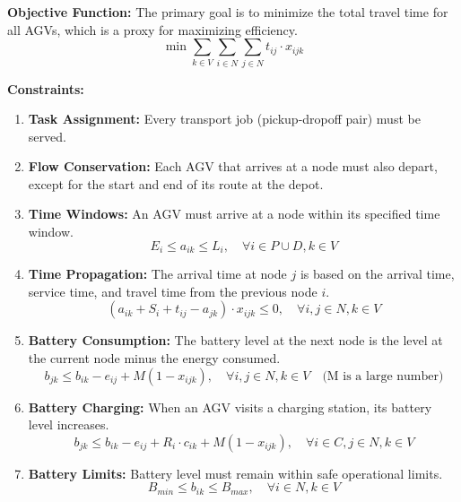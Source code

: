 \documentclass{article}
\begin{document}
\noindent \textbf{Objective Function:}
The primary goal is to minimize the total travel time for all AGVs, which is a proxy for maximizing efficiency.
\begin{equation}
\min \sum_{k \in V} \sum_{i \in N} \sum_{j \in N} t_{ij} \cdot x_{ijk}
\end{equation}

\noindent \textbf{Constraints:}
\begin{enumerate}
    \item \textbf{Task Assignment:} Every transport job (pickup-dropoff pair) must be served.
    \item \textbf{Flow Conservation:} Each AGV that arrives at a node must also depart, except for the start and end of its route at the depot.
    \item \textbf{Time Windows:} An AGV must arrive at a node within its specified time window.
    \begin{equation}
    E_i \leq a_{ik} \leq L_i, \quad \forall i \in P \cup D, k \in V
    \end{equation}
    \item \textbf{Time Propagation:} The arrival time at node $j$ is based on the arrival time, service time, and travel time from the previous node $i$.
    \begin{equation}
    (a_{ik} + S_i + t_{ij} - a_{jk}) \cdot x_{ijk} \leq 0, \quad \forall i, j \in N, k \in V
    \end{equation}
    \item \textbf{Battery Consumption:} The battery level at the next node is the level at the current node minus the energy consumed.
    \begin{equation}
    b_{jk} \leq b_{ik} - e_{ij} + M(1-x_{ijk}), \quad \forall i,j \in N, k \in V \quad \text{(M is a large number)}
    \end{equation}
    \item \textbf{Battery Charging:} When an AGV visits a charging station, its battery level increases.
    \begin{equation}
    b_{jk} \leq b_{ik} - e_{ij} + R_i \cdot c_{ik} + M(1-x_{ijk}), \quad \forall i \in C, j \in N, k \in V
    \end{equation}
    \item \textbf{Battery Limits:} Battery level must remain within safe operational limits.
    \begin{equation}
    B_{min} \leq b_{ik} \leq B_{max}, \quad \forall i \in N, k \in V
    \end{equation}
\end{enumerate}
\end{document}
